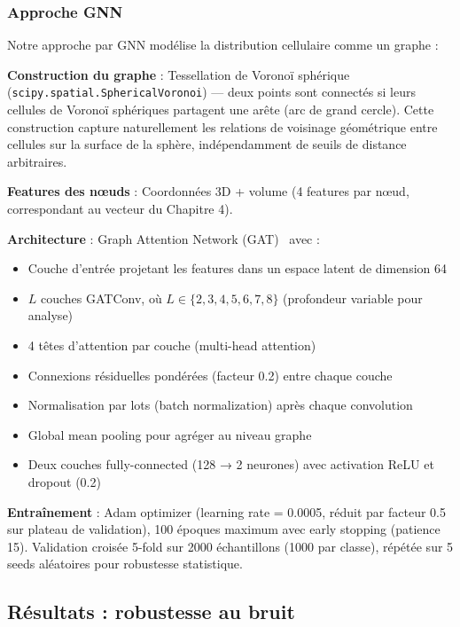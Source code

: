 \subsubsection{Approche GNN}

Notre approche par GNN modélise la distribution cellulaire comme un graphe :

\textbf{Construction du graphe} : Tessellation de Voronoï sphérique (\texttt{scipy.spatial.SphericalVoronoi}) — deux points sont connectés si leurs cellules de Voronoï sphériques partagent une arête (arc de grand cercle). Cette construction capture naturellement les relations de voisinage géométrique entre cellules sur la surface de la sphère, indépendamment de seuils de distance arbitraires.

\textbf{Features des nœuds} : Coordonnées 3D + volume (4 features par nœud, correspondant au vecteur du Chapitre 4).

\textbf{Architecture} : Graph Attention Network (GAT)~\cite{Velickovic2018} avec :
\begin{itemize}
    \item Couche d'entrée projetant les features dans un espace latent de dimension 64
    \item $L$ couches GATConv, où $L \in \{2, 3, 4, 5, 6, 7, 8\}$ (profondeur variable pour analyse)
    \item 4 têtes d'attention par couche (multi-head attention)
    \item Connexions résiduelles pondérées (facteur 0.2) entre chaque couche
    \item Normalisation par lots (batch normalization) après chaque convolution
    \item Global mean pooling pour agréger au niveau graphe
    \item Deux couches fully-connected (128 → 2 neurones) avec activation ReLU et dropout (0.2)
\end{itemize}

\textbf{Entraînement} : Adam optimizer (learning rate = 0.0005, réduit par facteur 0.5 sur plateau de validation), 100 époques maximum avec early stopping (patience 15). Validation croisée 5-fold sur 2000 échantillons (1000 par classe), répétée sur 5 seeds aléatoires pour robustesse statistique.

\subsection{Résultats : robustesse au bruit}

